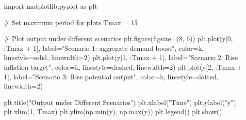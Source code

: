 \documentclass[
  letterpaper,
  DIV=11,
  numbers=noendperiod]{scrreprt}
\newenvironment{Shaded}{\begin{snugshade}}{\end{snugshade}}
\newcommand{\BuiltInTok}[1]{\textcolor[rgb]{0.00,0.23,0.31}{#1}}
\newcommand{\CommentTok}[1]{\textcolor[rgb]{0.37,0.37,0.37}{#1}}
\newcommand{\DecValTok}[1]{\textcolor[rgb]{0.68,0.00,0.00}{#1}}
\newcommand{\ImportTok}[1]{\textcolor[rgb]{0.00,0.46,0.62}{#1}}
\newcommand{\NormalTok}[1]{\textcolor[rgb]{0.00,0.23,0.31}{#1}}
\newcommand{\OperatorTok}[1]{\textcolor[rgb]{0.37,0.37,0.37}{#1}}
\newcommand{\StringTok}[1]{\textcolor[rgb]{0.13,0.47,0.30}{#1}}
\begin{document}
\begin{tcolorbox}[enhanced jigsaw, titlerule=0mm, breakable, bottomrule=.15mm, toprule=.15mm, colbacktitle=quarto-callout-note-color!10!white, rightrule=.15mm, toptitle=1mm, opacityback=0, left=2mm, coltitle=black, title=\textcolor{quarto-callout-note-color}{\faInfo}\hspace{0.5em}{Python code}, colframe=quarto-callout-note-color-frame, opacitybacktitle=0.6, leftrule=.75mm, bottomtitle=1mm, arc=.35mm, colback=white]

\begin{Shaded}
\begin{Highlighting}[]
\ImportTok{import}\NormalTok{ matplotlib.pyplot }\ImportTok{as}\NormalTok{ plt}

\CommentTok{\# Set maximum period for plots}
\NormalTok{Tmax }\OperatorTok{=} \DecValTok{15}

\CommentTok{\# Plot output under different scenarios}
\NormalTok{plt.figure(figsize}\OperatorTok{=}\NormalTok{(}\DecValTok{8}\NormalTok{, }\DecValTok{6}\NormalTok{))}
\NormalTok{plt.plot(y[}\DecValTok{0}\NormalTok{, :Tmax }\OperatorTok{+} \DecValTok{1}\NormalTok{], label}\OperatorTok{=}\StringTok{"Scenario 1: aggregate demand boost"}\NormalTok{,}
\NormalTok{         color}\OperatorTok{=}\StringTok{\textquotesingle{}k\textquotesingle{}}\NormalTok{, linestyle}\OperatorTok{=}\StringTok{\textquotesingle{}solid\textquotesingle{}}\NormalTok{, linewidth}\OperatorTok{=}\DecValTok{2}\NormalTok{)}
\NormalTok{plt.plot(y[}\DecValTok{1}\NormalTok{, :Tmax }\OperatorTok{+} \DecValTok{1}\NormalTok{], label}\OperatorTok{=}\StringTok{"Scenario 2: Rise inflation target"}\NormalTok{,}
\NormalTok{         color}\OperatorTok{=}\StringTok{\textquotesingle{}k\textquotesingle{}}\NormalTok{, linestyle}\OperatorTok{=}\StringTok{\textquotesingle{}dashed\textquotesingle{}}\NormalTok{, linewidth}\OperatorTok{=}\DecValTok{2}\NormalTok{)}
\NormalTok{plt.plot(y[}\DecValTok{2}\NormalTok{, :Tmax }\OperatorTok{+} \DecValTok{1}\NormalTok{], label}\OperatorTok{=}\StringTok{"Scenario 3: Rise potential output"}\NormalTok{,}
\NormalTok{         color}\OperatorTok{=}\StringTok{\textquotesingle{}k\textquotesingle{}}\NormalTok{, linestyle}\OperatorTok{=}\StringTok{\textquotesingle{}dotted\textquotesingle{}}\NormalTok{, linewidth}\OperatorTok{=}\DecValTok{2}\NormalTok{)}

\NormalTok{plt.title(}\StringTok{"Output under Different Scenarios"}\NormalTok{)}
\NormalTok{plt.xlabel(}\StringTok{"Time"}\NormalTok{)}
\NormalTok{plt.ylabel(}\StringTok{"y"}\NormalTok{)}
\NormalTok{plt.xlim(}\DecValTok{1}\NormalTok{, Tmax)}
\NormalTok{plt.ylim(np.}\BuiltInTok{min}\NormalTok{(y), np.}\BuiltInTok{max}\NormalTok{(y))}
\NormalTok{plt.legend()}
\NormalTok{plt.show()}
\end{Highlighting}
\end{Shaded}

\end{tcolorbox}
\end{document}
